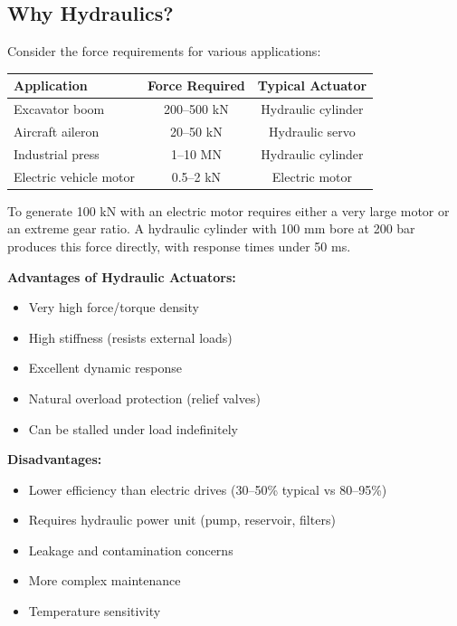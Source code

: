 \subsection{Why Hydraulics?}

Consider the force requirements for various applications:

\begin{center}
\begin{tabular}{lcc}
\toprule
\textbf{Application} & \textbf{Force Required} & \textbf{Typical Actuator} \\
\midrule
Excavator boom & 200--500 kN & Hydraulic cylinder \\
Aircraft aileron & 20--50 kN & Hydraulic servo \\
Industrial press & 1--10 MN & Hydraulic cylinder \\
Electric vehicle motor & 0.5--2 kN & Electric motor \\
\bottomrule
\end{tabular}
\end{center}

To generate 100 kN with an electric motor requires either a very large motor or an extreme gear ratio. A hydraulic cylinder with 100 mm bore at 200 bar produces this force directly, with response times under 50 ms.

\textbf{Advantages of Hydraulic Actuators:}
\begin{itemize}
    \item Very high force/torque density
    \item High stiffness (resists external loads)
    \item Excellent dynamic response
    \item Natural overload protection (relief valves)
    \item Can be stalled under load indefinitely
\end{itemize}

\textbf{Disadvantages:}
\begin{itemize}
    \item Lower efficiency than electric drives (30--50\% typical vs 80--95\%)
    \item Requires hydraulic power unit (pump, reservoir, filters)
    \item Leakage and contamination concerns
    \item More complex maintenance
    \item Temperature sensitivity
\end{itemize}

